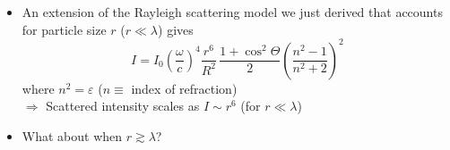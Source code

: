 \documentclass[11pt, oneside]{article}
\begin{document}
\begin{itemize}
\begin{itemize}
\begin{itemize}
			Moisture influences scattered intensity even in clear skies, but mainly by swelling aerosol particles (hygroscopic growth); water vapor itself changes molecular (Rayleigh) scattering only slightly (particulates will play an important role, as we will see in a bit)
			\item Polarization of light: dependence on scattering angle $\Theta$ only comes into vertically polarized term; $I_v \sim \cos^2\Theta$ $\Rightarrow$ $\Theta = \dfrac{\pi}{2}$ has only horizontally polarized light\\
			$\Rightarrow$ atmosphere acts as a polarizing filter, something that photographers who use polarizing filters will know very well
		\end{itemize}
	\end{itemize}
	\item An extension of the Rayleigh scattering model we just derived that accounts for particle size $r$ ($r \ll \lambda$) gives
	\begin{equation}
		\label{e:Isize}
		I = I_0\left(\frac{\omega}{c}\right)^4\frac{r^6}{R^2}\,\frac{1 + \cos^2\Theta}{2}\left(\frac{n^2 - 1}{n^2 + 2}\right)^2
	\end{equation}
	where $n^2 = \varepsilon$ ($n \equiv$ index of refraction)\\
	$\Rightarrow$ Scattered intensity scales as $I \sim r^6$ (for $r \ll \lambda$)
	\item What about when $r \gtrsim \lambda$?
\end{itemize}
\end{document}
